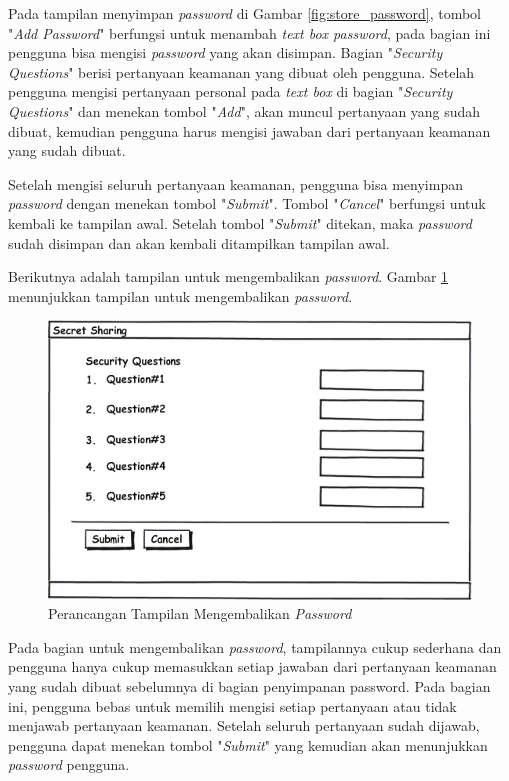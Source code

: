Pada tampilan menyimpan \textit{password} di Gambar \ref{fig:store_password}, tombol "\textit{Add Password}" berfungsi untuk menambah \textit{text box password}, pada bagian ini pengguna bisa mengisi \textit{password} yang akan disimpan. Bagian "\textit{Security Questions}" berisi pertanyaan keamanan yang dibuat oleh pengguna. Setelah pengguna mengisi pertanyaan personal pada \textit{text box} di bagian "\textit{Security Questions}" dan menekan tombol "\textit{Add}", akan muncul pertanyaan yang sudah dibuat, kemudian pengguna harus mengisi jawaban dari pertanyaan keamanan yang sudah dibuat.

Setelah mengisi seluruh pertanyaan keamanan, pengguna bisa menyimpan \textit{password} dengan menekan tombol "\textit{Submit}". Tombol "\textit{Cancel}" berfungsi untuk kembali ke tampilan awal. Setelah tombol "\textit{Submit}" ditekan, maka \textit{password} sudah disimpan dan akan kembali ditampilkan tampilan awal.

Berikutnya adalah tampilan untuk mengembalikan \textit{password}. Gambar \ref{fig:retrieve_password} menunjukkan tampilan untuk mengembalikan \textit{password}.

\begin{figure}[h]
	\centerline{\includegraphics[scale=0.5]{Gambar/retrieve_password}}
	\caption{Perancangan Tampilan Mengembalikan \textit{Password}}\label{fig:retrieve_password}
\end{figure}

Pada bagian untuk mengembalikan \textit{password}, tampilannya cukup sederhana dan pengguna hanya cukup memasukkan setiap jawaban dari pertanyaan keamanan yang sudah dibuat sebelumnya di bagian penyimpanan password. Pada bagian ini, pengguna bebas untuk memilih mengisi setiap pertanyaan atau tidak menjawab pertanyaan keamanan. Setelah seluruh pertanyaan sudah dijawab, pengguna dapat menekan tombol "\textit{Submit}" yang kemudian akan menunjukkan \textit{password} pengguna.

